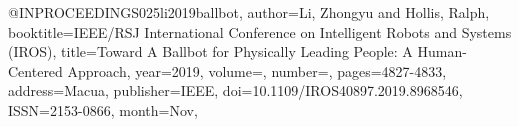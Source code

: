 @INPROCEEDINGS{025li2019ballbot,
author={Li, Zhongyu and Hollis, Ralph},
booktitle={IEEE/RSJ International Conference on Intelligent Robots and Systems (IROS)}, 
title={Toward A Ballbot for Physically Leading People: A Human-Centered Approach}, 
year={2019},
volume={},
number={},
pages={4827-4833},
address={Macua},
publisher={IEEE},
doi={10.1109/IROS40897.2019.8968546},
ISSN={2153-0866},
month={Nov},}